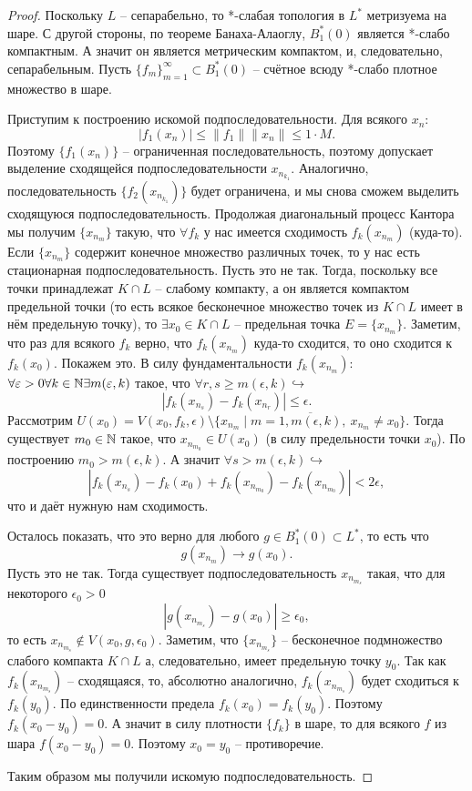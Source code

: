 \begin{proof}
    Поскольку $L$ -- сепарабельно, то *-слабая топология в $L^*$ метризуема на шаре.
    С другой стороны, по теореме Банаха-Алаоглу, $B_1^*(0)$ является *-слабо компактным.
    А значит он является метрическим компактом, и, следовательно, сепарабельным.
    Пусть $\{f_m\}_{m = 1}^{\infty} \subset B_1^*(0)$ -- счётное всюду *-слабо плотное множество в шаре.

    Приступим к построению искомой подпоследовательности.
    Для всякого $x_n\colon$
    \[
        |f_1(x_n)| \leq \|f_1\|\|x_n\| \leq 1 \cdot M.
    \]
    Поэтому $\{f_1(x_n)\}$ -- ограниченная последовательность, поэтому допускает выделение сходящейся подпоследовательности $x_{n_{k_1}}$.
    Аналогично, последовательность $\{f_2(x_{n_{k_1}})\}$ будет ограничена, и мы снова сможем выделить сходящуюся подпоследовательность.
    Продолжая диагональный процесс Кантора мы получим $\{x_{n_m}\}$ такую, что $\forall f_k$ у нас имеется сходимость $f_k(x_{n_m})$ (куда-то).
    Если $\{x_{n_m}\}$ содержит конечное множество различных точек, то у нас есть стационарная подпоследовательность.
    Пусть это не так.
    Тогда, поскольку все точки принадлежат $K \cap L$ -- слабому компакту, а он является компактом предельной точки (то есть всякое бесконечное множество точек из $K \cap L$ имеет в нём предельную точку), то $\exists x_0 \in K \cap L$ -- предельная точка $E = \{x_{n_m}\}$.
    Заметим, что раз для всякого $f_k$ верно, что $f_k(x_{n_m})$ куда-то сходится, то оно сходится к $f_k(x_0)$.
    Покажем это.
    В силу фундаментальности $f_k(x_{n_m}):$
    $\forall \varepsilon > 0 \forall k \in \mathbb{N} \exists m(\varepsilon, k)$ такое, что $\forall r, s \geq m(\epsilon, k) \hookrightarrow$
    \[
        |f_k(x_{n_s}) - f_k(x_{n_r})| \leq \epsilon.
    \]
    Рассмотрим $U(x_0) = V(x_0, f_k, \epsilon) \setminus \{x_{n_m} \mid m = \overline{1, m(\epsilon, k)}, \ x_{n_m} \neq x_0\}$.
    Тогда существует $m_0 \in \mathbb{N}$ такое, что $x_{n_{m_0}} \in U(x_0)$ (в силу предельности точки $x_0$).
    По построению $m_0 > m(\epsilon, k)$.
    А значит $\forall s > m(\epsilon, k) \hookrightarrow$
    \[
        |f_k(x_{n_s}) - f_k(x_0) + f_k(x_{n_{m_0}}) - f_k(x_{n_{m_0}})| < 2\epsilon,
    \]
    что и даёт нужную нам сходимость.

    Осталось показать, что это верно для любого $g \in B_1^*(0) \subset L^*$, то есть что
    \[
        g(x_{n_m}) \rightarrow g(x_0).
    \]
    Пусть это не так.
    Тогда существует подпоследовательность $x_{n_{m_{s}}}$ такая, что для некоторого $\epsilon_0 > 0$
    \[
        |g(x_{n_{m_{s}}}) - g(x_0)| \geq \epsilon_0,
    \]
    то есть $x_{n_{m_{s}}} \notin V(x_0, g, \epsilon_0)$.
    Заметим, что $\{x_{n_{m_{s}}}\}$ -- бесконечное подмножество слабого компакта $K \cap L$ а, следовательно, имеет предельную точку $y_0$.
    Так как $f_k(x_{n_{m_{s}}})$ -- сходящаяся, то, абсолютно аналогично, $f_k(x_{n_{m_{s}}})$ будет сходиться к $f_k(y_0)$.
    По единственности предела $f_k(x_0) = f_k(y_0)$.
    Поэтому $f_k(x_0 - y_0) = 0$.
    А значит в силу плотности $\{f_k\}$ в шаре, то для всякого $f$ из шара $f(x_0 - y_0) = 0$.
    Поэтому $x_0 = y_0$ -- противоречие.

    Таким образом мы получили искомую подпоследовательность.
\end{proof}
